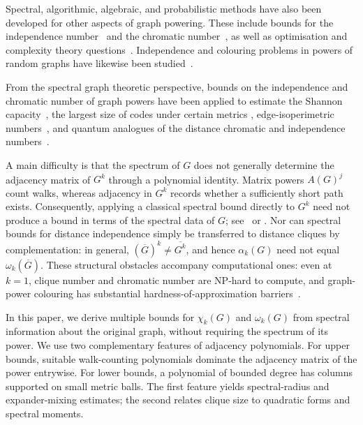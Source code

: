 \documentclass[10pt,a4paper]{article}
\theoremstyle{plain}
\numberwithin{equation}{section}
\begin{document}
Spectral, algorithmic, algebraic, and probabilistic methods have also been developed for other aspects of graph powering. These include bounds for the independence number~\cite{Atkinson_Frieze_2004,Abiad_Cioaba_Tait_2016,Abiad_Coutinho_Fiol_2019,Abiad_Zhou_2026} and the chromatic number~\cite{Alon_Mohar_2002,Kierstead_Yang_Yi_2020,Abiad_Coutinho_Fiol_Nogueira_Zeijlemaker_2022, Abiad_Zhou_2026}, as well as optimisation and complexity theory questions~\cite{Agnarsson_Halldorsson_2003,Molloy_Salavatipour_2005,Abiad_Hoesel_Michaux_2026,Chalermsook_Laekhanukit_Nanongkai_2014}. Independence and colouring problems in powers of random graphs have likewise been studied~\cite{Atkinson_Frieze_2004,Garapaty_Lokshtanov_Maji_Pothen_2023,Frieze_Kang_Raut_Sweering_Verbeek_2026}.


From the spectral graph theoretic perspective, bounds on the independence and chromatic number of graph powers have been applied to estimate the Shannon capacity~\cite{Fiol_2020, Abiad_Dalfo_Fiol_2026}, the largest size of codes under certain metrics \cite{APR2025,AbiadNeriReijnders2025}, edge-isoperimetric numbers~\cite{Abiad_vandeBerg_Juliano_Reijnders_Simoens_vanVeluw_Wittebol_2026}, and quantum analogues of the distance chromatic and independence numbers~\cite{Abiad_Jany_2025,Abiad_Meeus_2025,Wocjan_Elphick_Abiad_2022}. 

A main difficulty is that the spectrum of $G$ does not generally determine the adjacency matrix of $G^k$ through a polynomial identity. Matrix powers $A(G)^j$ count walks, whereas adjacency in $G^k$ records whether a sufficiently short path exists. Consequently, applying a classical spectral bound directly to $G^k$ need not produce a bound in terms of the spectral data of $G$; see~\cite[Sections~2 and~3]{Abiad_Coutinho_Fiol_Nogueira_Zeijlemaker_2022} or \cite{Das_Guo_2013, Xing_Zhou_2017}. Nor can spectral bounds for distance independence simply be transferred to distance cliques by complementation: in general, $(\overline{G})^k\neq\overline{G^k}$, and hence $\alpha_k(G)$ need not equal $\omega_k(\overline{G})$. These structural obstacles accompany computational ones: even at $k=1$, clique number and chromatic number are NP-hard to compute, and graph-power colouring has substantial hardness-of-approximation barriers~\cite{Chalermsook_Laekhanukit_Nanongkai_2014}.

In this paper, we derive multiple bounds for $\chi_k(G)$ and $\omega_k(G)$ from spectral information about the original graph, without requiring the spectrum of its power. We use two complementary features of adjacency polynomials. For upper bounds, suitable walk-counting polynomials dominate the adjacency matrix of the power entrywise. For lower bounds, a polynomial of bounded degree has columns supported on small metric balls. The first feature yields spectral-radius and expander-mixing estimates; the second relates clique size to quadratic forms and spectral moments.
\end{document}
